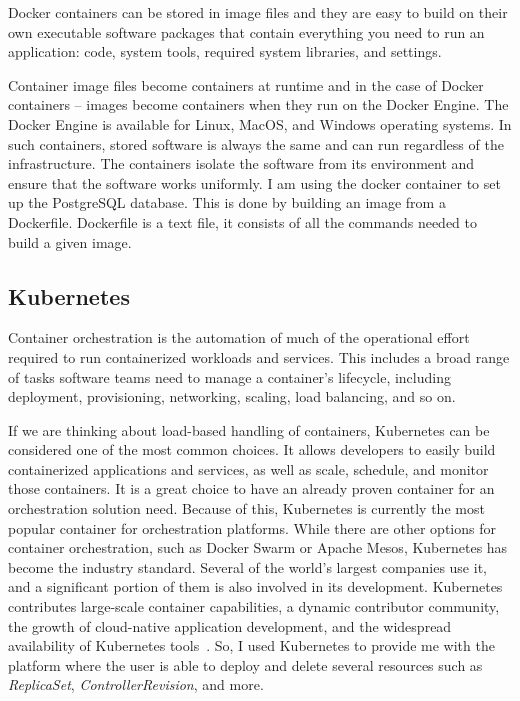 Docker containers can be stored in image files and they are easy to build on their own executable software packages that contain everything you need to run an application: code, system tools, required system libraries, and settings.

Container image files become containers at runtime and in the case of Docker containers – images become containers when they run on the Docker Engine. The Docker Engine is available for Linux, MacOS, and Windows operating systems. In such containers, stored software is always the same and can run regardless of the infrastructure. The containers isolate the software from its environment and ensure that the software works uniformly. I am using the docker container to set up the PostgreSQL database. This is done by building an image from a Dockerfile. Dockerfile is a text file, it consists of all the commands needed to build a given image. 

\subsection{Kubernetes}
Container orchestration is the automation of much of the operational effort required to run containerized workloads and services. This includes a broad range of tasks software teams need to manage a container’s lifecycle, including deployment, provisioning, networking, scaling, load balancing, and so on.

If we are thinking about load-based handling of containers, Kubernetes can be considered one of the most common choices. It allows developers to easily build containerized applications and services, as well as scale, schedule, and monitor those containers. It is a great choice to have an already proven container for an orchestration solution need. Because of this, Kubernetes is currently the most popular container for orchestration platforms. While there are other options for container orchestration, such as Docker Swarm or Apache Mesos, Kubernetes has become the industry standard. Several of the world’s largest companies use it, and a significant portion of them is also involved in its development. Kubernetes contributes large-scale container capabilities, a dynamic contributor community, the growth of cloud-native application development, and the widespread availability of Kubernetes tools~\cite{kubernetes}. So, I used Kubernetes to provide me with the platform where the user is able to deploy and delete several resources such as \textit{ReplicaSet}, \textit{ControllerRevision}, and more. 

